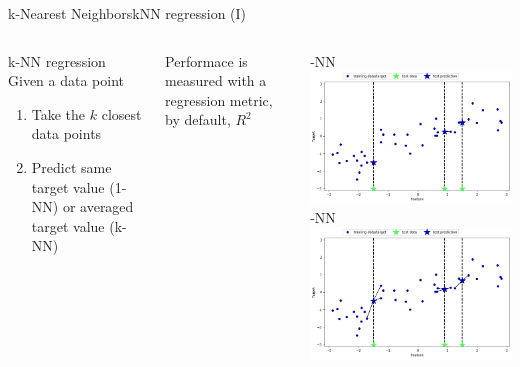\documentclass[10pt,compress]{beamer} %
\begin{document}
\begin{frame}{k-Nearest Neighbors}{kNN regression (I)}
    \begin{columns}
        \begin{block}{k-NN regression}
         Given a data point
        \begin{enumerate}
            \item Take the $k$ closest data points
            \item Predict same target value (1-NN) or averaged target value (k-NN)
        \end{enumerate}
        \end{block}

        Performace is measured with a regression metric, by default, $R^2$

        -NN\\
	        \includegraphics[width=\textwidth]{figs/1-nn-reg.png}
         -NN\\
	        \includegraphics[width=\textwidth]{figs/3-nn-reg.png}
    \end{columns}
\end{frame}
\end{document}
